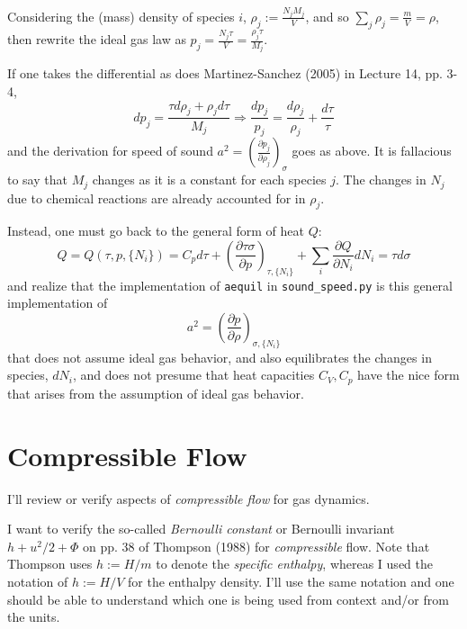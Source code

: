 \documentclass[10pt]{amsart}
\begin{document}
\begin{multicols*}{2}
Considering the (mass) density of species $i$, $\rho_j := \frac{N_j M_j}{V}$, and so $\sum_j \rho_j = \frac{m}{V} = \rho$, then rewrite the ideal gas law as $p_j = \frac{N_j\tau}{V} = \frac{ \rho_j \tau }{M_j}$.  

If one takes the differential as does Martinez-Sanchez (2005) \cite{MMartinez-Sanchez2005} in Lecture 14, pp. 3-4, 
\[
dp_j = \frac{ \tau d\rho_j + \rho_j d\tau }{M_j} \Longrightarrow \frac{dp_j}{p_j} = \frac{d\rho_j}{\rho_j} + \frac{d\tau}{\tau}
\]
and the derivation for speed of sound $a^2 = \left( \frac{ \partial p_j}{ \partial \rho_j} \right)_{\sigma}$ goes as above.  It is fallacious to say that $M_j$ changes as it is a constant for each species $j$.  The changes in $N_j$ due to chemical reactions are already accounted for in $\rho_j$.  

Instead, one must go back to the general form of heat $Q$:
\[
Q = Q(\tau,p,\lbrace N_i \rbrace) = C_p d\tau + \left( \frac{ \partial \tau \sigma }{ \partial p} \right)_{\tau, \lbrace N_i \rbrace } + \sum_i \frac{ \partial Q}{ \partial N_i} dN_i = \tau d\sigma
\]
and realize that the implementation of \verb|aequil| in \verb|sound_speed.py| is this general implementation of 
\[
a^2 = \left( \frac{ \partial p }{ \partial \rho } \right)_{\sigma, \lbrace N_i \rbrace}
\]
that does not assume ideal gas behavior, and also equilibrates the changes in species, $dN_i$, and does not presume that heat capacities $C_V, C_p$ have the nice form that arises from the assumption of ideal gas behavior.  


\part{Compressible Flow}

I'll review or verify aspects of \emph{compressible flow} for gas dynamics.  

I want to verify the so-called \emph{Bernoulli constant} or Bernoulli invariant $h+u^2/2 + \Phi$ on pp. 38 of Thompson (1988) \cite{PThompson1988} for \emph{compressible} flow.  Note that Thompson uses $h:= H/m$ to denote the \emph{specific enthalpy}, whereas I used the notation of $h:=H/V$ for the enthalpy density.  I'll use the same notation and one should be able to understand which one is being used from context and/or from the units.  


\end{multicols*}
\end{document}
